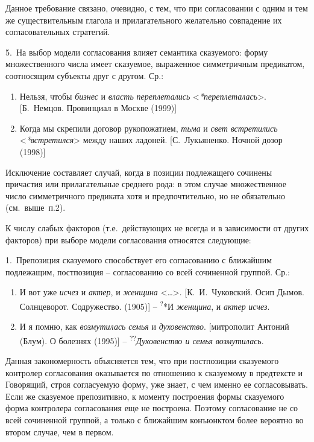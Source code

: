 Данное требование связано, очевидно, с тем, что при согласовании с одним
и тем же существительным глагола и прилагательного желательно совпадение
их согласовательных стратегий.

5.~На выбор модели согласования влияет семантика сказуемого: форму
множественного числа имеет сказуемое, выраженное симметричным
предикатом, соотносящим субъекты друг с другом. Ср.:

\begin{enumerate}
\def\labelenumi{(\arabic{enumi})}
\setcounter{enumi}{97}
\item
  Нельзя, чтобы \emph{бизнес} и \emph{власть} \emph{переплетались}
  \textless{}\emph{*переплеталась}\textgreater. {[}Б.~Немцов. Провинциал
  в Москве (1999){]}
\item
  Когда мы скрепили договор рукопожатием, \emph{тьма} и \emph{свет}
  \emph{встретились} \textless{}\emph{*встретился}\textgreater{} между
  наших ладоней. {[}С.~Лукьяненко. Ночной дозор (1998){]}
\end{enumerate}

Исключение составляет случай, когда в позиции подлежащего сочинены
причастия или прилагательные среднего рода: в этом случае множественное
число симметричного предиката хотя и предпочтительно, но не обязательно
(см.~выше~п.2).

К числу слабых факторов (т.е.~действующих не всегда и в зависимости от
других факторов) при выборе модели согласования относятся следующие:

1.~Препозиция сказуемого способствует его согласованию с ближайшим
подлежащим, постпозиция -- согласованию со всей сочиненной группой. Ср.:

\begin{enumerate}
\def\labelenumi{(\arabic{enumi})}
\setcounter{enumi}{99}
\item
  И вот уже \emph{исчез} и \emph{актер}, и \emph{женщина}
  \textless\ldots\textgreater. {[}К.~И.~Чуковский. Осип Дымов.
  Солнцеворот. Содружество. (1905){]} -- \textsuperscript{?}*И
  \emph{женщина}, и \emph{актер} \emph{исчез}.
\item
  И я помню, как \emph{возмутилась} \emph{семья} и \emph{духовенство}.
  {[}митрополит Антоний (Блум). О болезнях (1995){]} --
  \textsuperscript{??}\emph{Духовенство и семья} \emph{возмутилась}.
\end{enumerate}

Данная закономерность объясняется тем, что при постпозиции сказуемого
контролер согласования оказывается по отношению к сказуемому в
предтексте и Говорящий, строя согласуемую форму, уже знает, с чем именно
ее согласовывать. Если же сказуемое препозитивно, к моменту построения
формы сказуемого форма контролера согласования еще не построена. Поэтому
согласование не со всей сочиненной группой, а только с ближайшим
конъюнктом более вероятно во втором случае, чем в первом.

